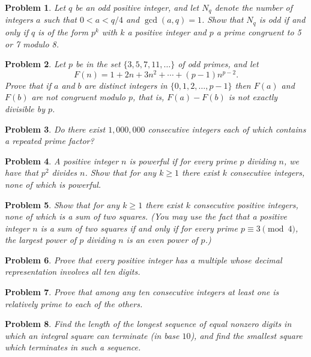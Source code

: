 \documentclass[12pt]{article}
\newtheorem{problem}{Problem}
\begin{document}
\begin{problem}
Let $q$ be an odd positive integer, and let $N_q$ denote the number of integers $a$ such that $0 < a < q/4$ and $\gcd(a, q) = 1$. Show that $N_q$ is odd if and only if $q$ is of the form $p^k$ with $k$ a positive integer and $p$ a prime congruent to 5 or 7 modulo 8.
\end{problem}

\begin{problem}
Let $p$ be in the set $\{3, 5, 7, 11, \ldots\}$ of odd primes, and let
\[
F(n) = 1 + 2n + 3n^2 + \cdots + (p-1) n^{p-2}.
\]
Prove that if $a$ and $b$ are distinct integers in $\{0, 1, 2, \ldots, p-1\}$ then $F(a)$ and $F(b)$ are not congruent modulo $p$, that is, $F(a) - F(b)$ is not exactly divisible by $p$.
\end{problem}

\begin{problem}
Do there exist $1,000,000$ consecutive integers each of which contains a repeated prime factor?
\end{problem}

\begin{problem}
\textbf{\textcolor{red}{\heart}}
A positive integer $n$ is powerful if for every prime $p$ dividing $n$, we have that $p^2$ divides $n$. Show that for any $k \geq 1$ there exist $k$ consecutive integers, none of which is powerful.
\end{problem}

\begin{problem}
Show that for any $k \geq 1$ there exist $k$ consecutive positive integers, none of which is a sum of two squares. (You may use the fact that a positive integer $n$ is a sum of two squares if and only if for every prime $p \equiv 3 \pmod 4$, the largest power of $p$ dividing $n$ is an even power of $p$.)
\end{problem}

\begin{problem}
Prove that every positive integer has a multiple whose decimal representation involves all ten digits.
\end{problem}

\begin{problem}
Prove that among any ten consecutive integers at least one is relatively prime to each of the others.
\end{problem}

\begin{problem}
Find the length of the longest sequence of equal nonzero digits in which an integral square can terminate (in base $10$), and find the smallest square which terminates in such a sequence.
\end{problem}
\end{document}
